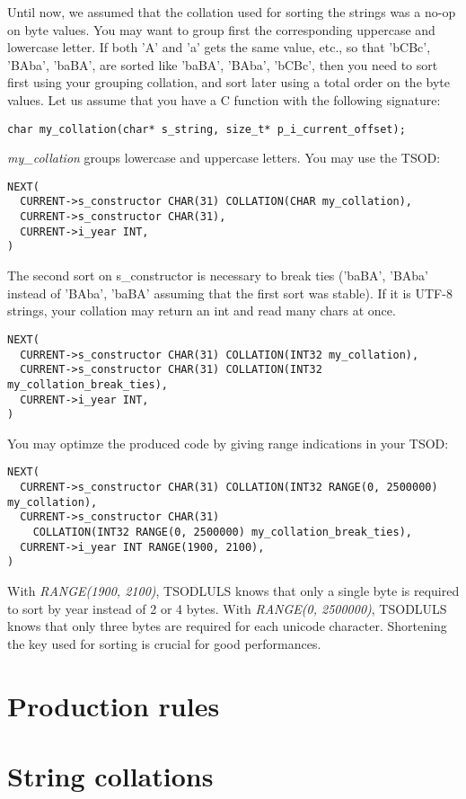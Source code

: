 \documentclass[a4paper,11pt]{report}
\begin{document}
Until now, we assumed that the collation used for sorting the strings was a no-op on byte values.
You may want to group first the corresponding uppercase and lowercase letter.
If both 'A' and 'a' gets the same value, etc.,
so that 'bCBc', 'BAba', 'baBA',  are sorted
like 'baBA', 'BAba', 'bCBc',
then you need to sort first using your grouping collation,
and sort later using a total order on the byte values.
Let us assume that you have a C function with the following signature:
\begin{verbatim}
char my_collation(char* s_string, size_t* p_i_current_offset);
\end{verbatim}
\emph{my\_collation} groups lowercase and uppercase letters.
You may use the TSOD:
\begin{verbatim}
NEXT(
  CURRENT->s_constructor CHAR(31) COLLATION(CHAR my_collation),
  CURRENT->s_constructor CHAR(31),
  CURRENT->i_year INT,
)
\end{verbatim}
The second sort on s\_constructor is necessary to break ties
('baBA', 'BAba' instead of 'BAba', 'baBA' assuming that the first sort was stable).
If it is UTF-8 strings, your collation may return an int and read many chars at once.
\begin{verbatim}
NEXT(
  CURRENT->s_constructor CHAR(31) COLLATION(INT32 my_collation),
  CURRENT->s_constructor CHAR(31) COLLATION(INT32 my_collation_break_ties),
  CURRENT->i_year INT,
)
\end{verbatim}

You may optimze the produced code by giving range indications in your TSOD:
\begin{verbatim}
NEXT(
  CURRENT->s_constructor CHAR(31) COLLATION(INT32 RANGE(0, 2500000) my_collation),
  CURRENT->s_constructor CHAR(31)
    COLLATION(INT32 RANGE(0, 2500000) my_collation_break_ties),
  CURRENT->i_year INT RANGE(1900, 2100),
)
\end{verbatim}
With \emph{RANGE(1900, 2100)}, TSODLULS knows that only a single byte is required to sort by year instead of 2 or 4 bytes.
With \emph{RANGE(0, 2500000)}, TSODLULS knows that only three bytes are required for each unicode character.
Shortening the key used for sorting is crucial for good performances.


\chapter{Production rules}
\label{chapter:production_rules}

\chapter{String collations}
\label{chapter:string collations}
\end{document}
